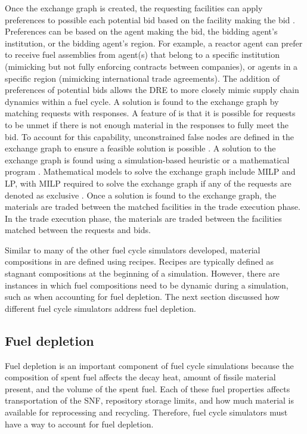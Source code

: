 Once the exchange graph is created, the requesting facilities can apply 
preferences to possible each potential bid based on the facility 
making the bid \cite{huff_fundamental_2016}. Preferences can be based on 
the agent making the bid, the bidding agent's institution, or 
the bidding agent's 
region. For example, a reactor agent can prefer to receive fuel 
assemblies from agent(s) that belong to a specific institution (mimicking but not 
fully enforcing contracts between companies), or agents in a specific region 
(mimicking international trade agreements). The addition of preferences of 
potential bids allows the \gls{DRE} to more closely mimic supply chain 
dynamics within a fuel cycle. 
A solution is found to the exchange graph by matching requests with 
responses. A feature of \Cyclus is that it is possible for 
requests to be unmet if there is not enough material in the responses 
to fully meet the bid. To account for this 
capability, unconstrained false nodes are defined in the exchange graph
to ensure a feasible solution is possible \cite{gidden_methodology_2016}.
A solution to the exchange graph is found using a simulation-based 
heuristic or a mathematical program \cite{gidden_agent-based_2015}.
Mathematical models to solve the exchange graph include \gls{MILP} and 
\gls{LP}, with \gls{MILP} required to solve the exchange graph if 
any of the requests are denoted as exclusive \cite{huff_fundamental_2016}.
Once a solution is found to the exchange graph, the materials are 
traded between the matched facilities in the trade execution phase.  
In the trade execution phase, the materials are traded between the 
facilities matched between the requests and bids. 

Similar to many of the other fuel cycle simulators developed, material 
compositions in \Cyclus are defined using recipes. Recipes are 
typically defined as stagnant compositions at the beginning of 
a simulation. However, there are instances in which fuel compositions 
need to be dynamic during a simulation, such as when accounting for fuel 
depletion. The next section discussed how different fuel 
cycle simulators address fuel depletion. 

\subsection{Fuel depletion}
Fuel depletion is an important component of fuel cycle simulations 
because the composition of spent fuel affects the decay heat, 
amount of fissile material present, and the volume of the spent 
fuel. Each of these fuel properties affects transportation of the 
\gls{SNF}, 
repository storage limits, and how much material is available for 
reprocessing and recycling. Therefore, fuel cycle simulators must 
have a way to account for fuel depletion. 

